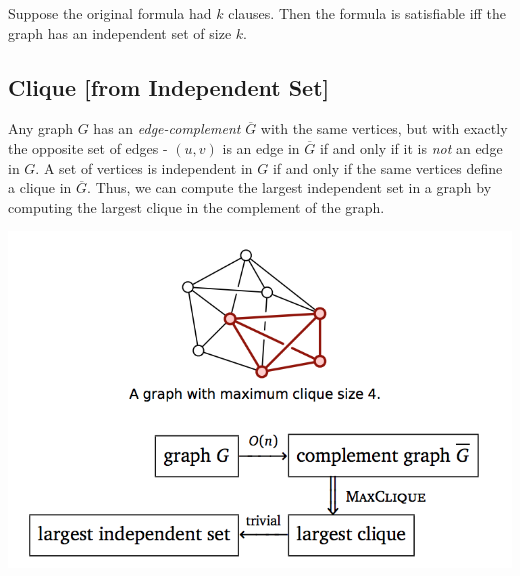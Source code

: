 Suppose the original formula had $k$ clauses. Then the formula is satisfiable iff the graph has an independent set of size $k$.

\subsection{Clique [from Independent Set]}
Any graph $G$ has an \emph{edge-complement} $\overline{G}$ with the same vertices, but with exactly the opposite set of edges - $(u, v)$ is an edge in $\overline{G}$ if and only if it is \emph{not} an edge in $G$. A set of vertices is independent in $G$ if and only if the same vertices define a clique in $\overline{G}$. Thus, we can compute the largest independent set in a graph by computing the largest clique in the complement of the graph.

\includegraphics[width=\linewidth]{images/maxclique.png}

